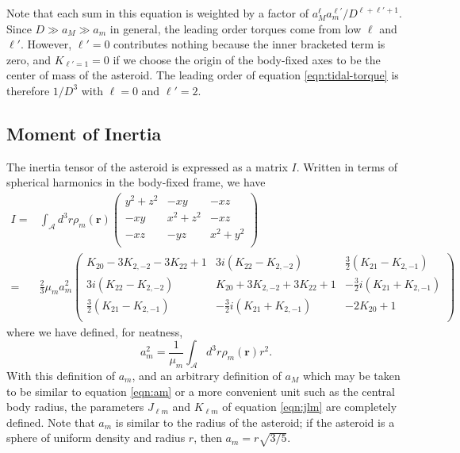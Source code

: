 \documentclass[11pt]{article}
\newcommand{\parens}[1]{\left( #1 \right)}
\begin{document}
Note that each sum in this equation is weighted by a factor of $a_M^\ell a_m^{\ell'}/D^{\ell+\ell'+1}$. Since $D \gg a_M \gg a_m$ in general, the leading order torques come from low $\ell$ and $\ell'$. However, $\ell'=0$ contributes nothing because the inner bracketed term is zero, and $K_{\ell' = 1} = 0$ if we choose the origin of the body-fixed axes to be the center of mass of the asteroid. The leading order of equation \ref{eqn:tidal-torque} is therefore $1/D^3$ with $\ell = 0$ and $\ell' = 2$.



\subsection{Moment of Inertia}
The inertia tensor of the asteroid is expressed as a matrix $I$. Written in terms of spherical harmonics in the body-fixed frame, we have
\begin{equation}
\begin{aligned}
I = &\int_\mathcal{A} d^3 r\rho_m(\bm r) \parens{\begin{matrix}
y^2 + z^2 & -xy & -xz \\
-xy & x^2 + z^2 & -xz \\
-xz & -yz & x^2 + y^2 \\
\end{matrix}}\\
= &\frac{2}{3}\mu_m a_m^2\parens{\begin{matrix}
K_{20}-3K_{2,-2}-3K_{22}+1 & 3i \parens{K_{22}-K_{2,-2}} & \frac{3}{2}\parens{K_{21}-K_{2,-1}}\\
3i \parens{K_{22}-K_{2,-2}} & K_{20}+3K_{2,-2}+3K_{22}+1 & -\frac{3}{2}i\parens{K_{21}+K_{2,-1}}\\
\frac{3}{2}\parens{K_{21}-K_{2,-1}} & -\frac{3}{2}i\parens{K_{21}+K_{2,-1}} & -2K_{20}+1\\
\end{matrix}}
\end{aligned}
\label{eqn:moi}
\end{equation}
where we have defined, for neatness,
\begin{equation}
a_m^2=\frac{1}{\mu_m}\int_\mathcal{A} d^3 r \rho_m(\bm r) r^2.
\label{eqn:am}
\end{equation}
With this definition of $a_m$, and an arbitrary definition of $a_M$ which may be taken to be similar to equation \ref{eqn:am} or a more convenient unit such as the central body radius, the parameters $J_{\ell m}$ and $K_{\ell m}$ of equation \ref{eqn:jlm} are completely defined. Note that $a_m$ is similar to the radius of the asteroid; if the asteroid is a sphere of uniform density and radius $r$, then $a_m = r\sqrt{3/5}$.
\end{document}
